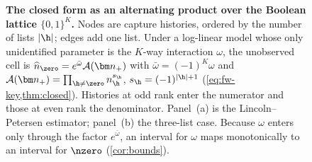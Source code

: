 \begin{figure}[t]
\caption{\textbf{The closed form as an alternating product over the Boolean
lattice $\{0,1\}^K$.} Nodes are capture histories, ordered by the number
of lists $|\h|$; edges add one list. Under a log-linear model whose only
unidentified parameter is the $K$-way interaction $\omega$, the unobserved
cell is $\widehat{n}_{\zero}=e^{\bar\omega}\mathcal{A}(\bm n_+)$ with
$\bar\omega=(-1)^K\omega$ and $\mathcal{A}(\bm n_+)=\prod_{\h\neq\zero}
n_{\h}^{s_{\h}}$, $s_{\h}=(-1)^{|\h|+1}$ (\cref{eq:fw-key,thm:closed}).
Histories at odd rank enter the numerator and those at even rank the
denominator. Panel~(a) is the
Lincoln--Petersen estimator; panel~(b) the three-list case. Because $\omega$
enters only through the factor $e^{\bar\omega}$, an interval for $\omega$
maps monotonically to an interval for $\nzero$ (\cref{cor:bounds}).}
\label{fig:lattice}
\end{figure}
